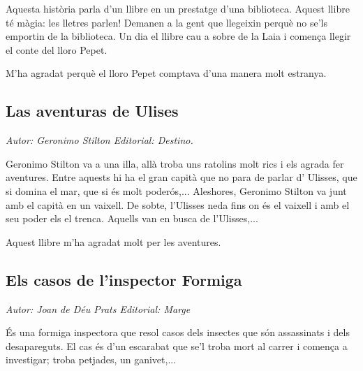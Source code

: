 \begin{news}
Aquesta història parla d’un llibre en un prestatge d’una biblioteca. Aquest llibre té màgia: les lletres parlen! Demanen a la gent que llegeixin perquè no se’ls emportin de la biblioteca. Un dia el llibre cau a sobre de la Laia i comença llegir el conte del lloro Pepet.

M’ha agradat perquè el lloro Pepet comptava d’una manera molt estranya.



\subsection*{Las aventuras de Ulises}
\emph{Autor: Geronimo Stilton    Editorial: Destino.}

Geronimo Stilton va a una illa, allà troba uns ratolins molt rics i els agrada fer aventures. Entre aquests hi ha el gran capità que no para de parlar d’ Ulisses, que si domina el mar, que si és molt poderós,... Aleshores, Geronimo Stilton va junt amb el capità en un vaixell. De sobte, l’Ulisses neda fins on és el vaixell i amb el seu poder els el trenca. Aquells van en busca de l’Ulisses,... 
	
Aquest llibre m’ha agradat molt per les aventures.


\subsection*{Els casos de l’inspector Formiga}
\emph{Autor: Joan de Déu Prats    Editorial: Marge}

\noindent{}

És una formiga inspectora que resol casos dels insectes que són assassinats i dels desapareguts. El cas és d’un escarabat que se’l troba mort al carrer i comença a investigar; troba petjades, un ganivet,...


\end{news}
